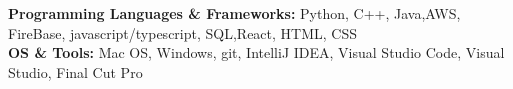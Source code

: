 

\begin{cvparagraph}

\textbf{Programming Languages \& Frameworks:}  Python, C++, Java,AWS, FireBase, javascript/typescript, SQL,React, HTML, CSS
\\[2pt]
\textbf{OS \& Tools:} Mac OS, Windows, git, IntelliJ IDEA, Visual Studio Code, Visual Studio, Final Cut Pro


\end{cvparagraph}
